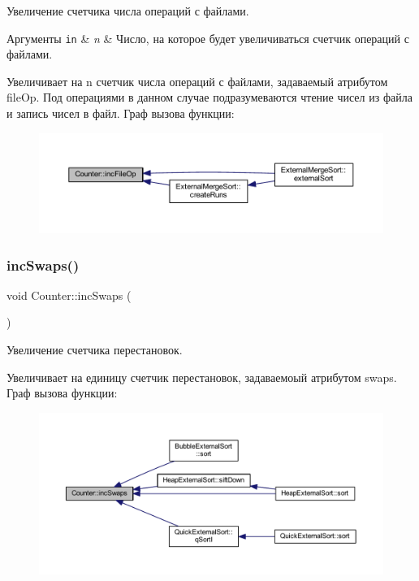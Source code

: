 Увеличение счетчика числа операций с файлами. 


\begin{DoxyParams}[1]{Аргументы}
\mbox{\tt in}  & {\em n} & Число, на которое будет увеличиваться счетчик операций с файлами.\\
\hline
\end{DoxyParams}
Увеличивает на n счетчик числа операций с файлами, задаваемый атрибутом file\+Op. Под операциями в данном случае подразумеваются чтение чисел из файла и запись чисел в файл. Граф вызова функции\+:\nopagebreak
\begin{figure}[H]
\begin{center}
\leavevmode
\includegraphics[width=350pt]{class_counter_a63310182709c321ad8fe8e78b81d12aa_icgraph}
\end{center}
\end{figure}
\hypertarget{class_counter_aa0cd30379394257e44aa7afc84ed1fce}{}\label{class_counter_aa0cd30379394257e44aa7afc84ed1fce} 
\subsubsection{\texorpdfstring{inc\+Swaps()}{incSwaps()}}
{\footnotesize\ttfamily void Counter\+::inc\+Swaps (\begin{DoxyParamCaption}{ }\end{DoxyParamCaption})}



Увеличение счетчика перестановок. 

Увеличивает на единицу счетчик перестановок, задаваемоый атрибутом swaps. Граф вызова функции\+:\nopagebreak
\begin{figure}[H]
\begin{center}
\leavevmode
\includegraphics[width=350pt]{class_counter_aa0cd30379394257e44aa7afc84ed1fce_icgraph}
\end{center}
\end{figure}
\hypertarget{class_counter_a71dea1262b81493aa9734f62a72b2691}{}\label{class_counter_a71dea1262b81493aa9734f62a72b2691} 
